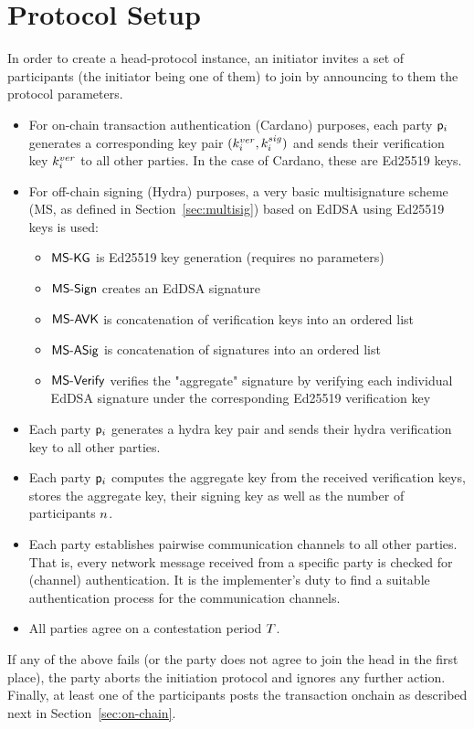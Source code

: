 
\section{Protocol Setup}\label{sec:setup}
In order to create a head-protocol instance, an initiator invites a set of
participants (the initiator being one of them) to join by announcing to them the
protocol parameters.

\begin{itemize}
	\item For on-chain transaction authentication (Cardano) purposes, each party
	      $\mathsf p_i$ generates a corresponding key pair $(k^{ver}_{i},k^{sig}_{i})$
	      and sends their verification key $k^{ver}_{i}$ to all other parties. In
	      the case of Cardano, these are Ed25519 keys.

	\item For off-chain signing (Hydra) purposes, a very basic multisignature scheme (MS, as defined in Section~\ref{sec:multisig}) based on EdDSA using Ed25519 keys is used:
	      \begin{itemize}
		      \item $\mathsf{MS\textsf{-}{}KG}$ is Ed25519 key generation (requires no parameters)
		      \item $\mathsf{MS\textsf{-}{}Sign}$ creates an EdDSA signature
		      \item $\mathsf{MS\textsf{-}{}AVK}$ is concatenation of verification keys into an ordered list
		      \item $\mathsf{MS\textsf{-}{}ASig}$ is concatenation of signatures into an ordered list
		      \item $\mathsf{MS\textsf{-}{}Verify}$ verifies the "aggregate" signature by verifying each individual EdDSA signature under the corresponding Ed25519 verification key
	      \end{itemize}

	\item Each party $\mathsf p_i$ generates a hydra key pair and sends their hydra verification key to all other parties.

	\item Each party $\mathsf p_i$ computes the aggregate key from the received verification keys, stores the aggregate key,
	      their signing key as well as the number of participants $n$.

	\item Each party establishes pairwise communication channels to all other parties. That is, every network message received from a specific party is checked for (channel) authentication. It is the implementer’s duty to find a suitable authentication process for the communication channels.

	\item All parties agree on a contestation period $T$.
\end{itemize}

If any of the above fails (or the party does not agree to join the head in the
first place), the party aborts the initiation protocol and ignores any further
action. Finally, at least one of the participants posts the \mtxInit{} transaction
onchain as described next in Section~\ref{sec:on-chain}.

